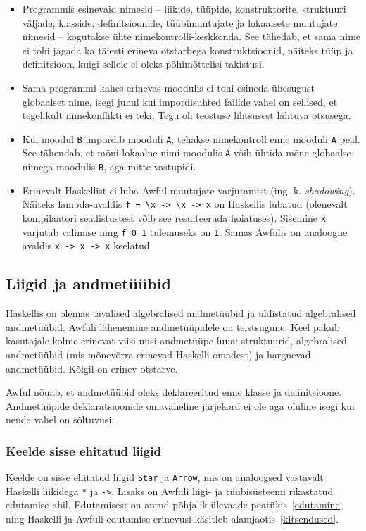 \documentclass[12pt]{article}
\begin{document}
      \begin{itemize}
        \item
          Programmis esinevaid nimesid -- liikide, tüüpide, konstruktorite, struktuuri väljade, klasside, definitsioonide, tüübimuutujate ja lokaalsete muutujate nimesid -- kogutakse ühte nimekontrolli-keskkonda. See tähedab, et sama nime ei tohi jagada ka täiesti erineva otstarbega konstruktsioonid, näiteks tüüp ja definitsioon, kuigi sellele ei oleks põhimõttelisi takistusi.
        \item
          Sama programmi kahes erinevas moodulis ei tohi esineda ühesugust globaalset nime, isegi juhul kui impordisuhted failide vahel on sellised, et tegelikult nimekonflikti ei teki. Tegu oli teostuse lihtsusest lähtuva otsusega.
        \item
          Kui moodul \verb!B! impordib mooduli \verb!A!, tehakse nimekontroll enne mooduli \verb!A! peal. See tähendab, et mõni lokaalne nimi moodulis \verb!A! võib ühtida mõne globaalse nimega moodulis \verb!B!, aga mitte vastupidi.
        \item
          Erinevalt Haskellist ei luba Awful muutujate varjutamist (ing. k. \textit{shadowing}). Näiteks lambda-avaldis \verb!f = \x -> \x -> x! on Haskellis lubatud (olenevalt kompilaatori seadistustest võib see resulteeruda hoiatuses). Sisemine \verb!x! varjutab välimise ning \verb!f 0 1! tulemuseks on \verb!1!. Samas Awfulis on analoogne avaldis \verb!x -> x -> x! keelatud.
      \end{itemize}
    \subsection{Liigid ja andmetüübid}
      Haskellis on olemas tavalised algebralised andmetüübid ja üldistatud algebralised andmetüübid. Awfuli lähenemine andmetüüpidele on teistsugune. Keel pakub kasutajale kolme erinevat viisi uusi andmetüüpe luua: struktuurid, algebralised andmetüübid (mis mõnevõrra erinevad Haskelli omadest) ja hargnevad andmetüübid. Kõigil on erinev otstarve.

      Awful nõuab, et andmetüübid oleks deklareeritud enne klasse ja definitsioone. Andmetüüpide deklaratsioonide omavaheline järjekord ei ole aga oluline isegi kui nende vahel on sõltuvusi.
      \subsubsection{Keelde sisse ehitatud liigid}
        Keelde on sisse ehitatud liigid \verb!Star! ja \verb!Arrow!, mis on analoogsed vastavalt Haskelli liikidega \verb!*! ja \verb!->!. Lisaks on Awfuli liigi- ja tüübisüsteemi rikastatud edutamise abil. Edutamisest on antud põhjalik ülevaade peatükis~\ref{edutamine} ning Haskelli ja Awfuli edutamise erinevusi käsitleb alamjaotis~\ref{kitsendused}.
\end{document}
